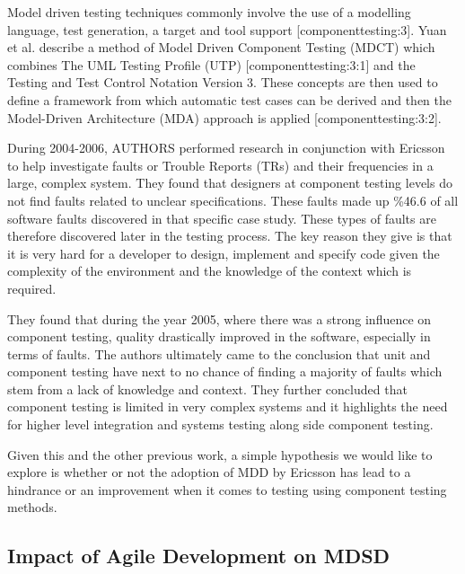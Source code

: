\documentclass[fina_report_innit.tex]{subfiles}
\begin{document}
Model driven testing techniques commonly involve the use of a modelling language, test generation, a target and tool support [componenttesting:3]. Yuan et al. describe a method of Model Driven Component Testing (MDCT) which combines The UML Testing Profile (UTP) [componenttesting:3:1] and the Testing and Test Control Notation Version 3. These concepts are then used to define a framework from which automatic test cases can be derived and then the Model-Driven Architecture (MDA) approach is applied [componenttesting:3:2]. 

During 2004-2006, AUTHORS performed research in conjunction with Ericsson to help investigate faults or Trouble Reports (TRs) and their frequencies in a large, complex system. They found that designers at component testing levels do not find faults related to unclear specifications. These faults made up \%46.6 of all software faults discovered in that specific case study. These types of faults are therefore discovered later in the testing process. The key reason they give is that it is very hard for a developer to design, implement and specify code given the complexity of the environment and the knowledge of the context which is required. 

They found that during the year 2005, where there was a strong influence on component testing, quality drastically improved in the software, especially in terms of faults. The authors ultimately came to the conclusion that unit and component testing have next to no chance of finding a majority of faults which stem from a lack of knowledge and context. They further concluded that component testing is limited in very complex systems and it highlights the need for higher level integration and systems testing along side component testing.

Given this and the other previous work, a simple hypothesis we would like to explore is whether or not the adoption of MDD by Ericsson has lead to a hindrance or an improvement when it comes to testing using component testing methods.

\subsection{Impact of Agile Development on MDSD}
\end{document}
